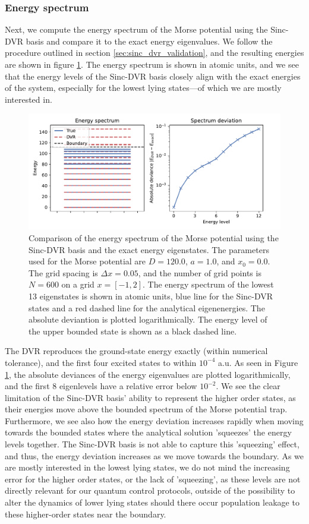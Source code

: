 \documentclass{subfiles}
\begin{document}
\subsubsection*{Energy spectrum}
Next, we compute the energy spectrum of the Morse potential using the Sinc-DVR basis and compare it to the exact energy eigenvalues. We follow the procedure outlined in section \ref{sec:sinc_dvr_validation}, and the resulting energies are shown in figure \ref{fig:dvr_validation}. The energy spectrum is shown in atomic units, and we see that the energy levels of the Sinc-DVR basis closely align with the exact energies of the system, especially for the lowest lying states—of which we are mostly interested in. 
\begin{figure}[h!]
    \centering
    \includegraphics[width=\textwidth]{figs/dvr_validation.pdf}
    \caption{Comparison of the energy spectrum of the Morse potential using the Sinc-DVR basis and the exact energy eigenstates. The parameters used for the Morse potential are $D = 120.0$, $a = 1.0$, and $x_0 = 0.0$. The grid spacing is $\Delta x = 0.05$, and the number of grid points is $N = 600$ on a grid $x=[-1, 2]$. The energy spectrum of the lowest 13 eigenstates is shown in atomic units, blue line for the Sinc-DVR states and a red dashed line for the analytical eigenenergies. The absolute deviantion is plotted logarithmically. The energy level of the upper bounded state is shown as a black dashed line.}
    \label{fig:dvr_validation}
\end{figure}

The DVR reproduces the ground-state energy exactly (within numerical tolerance), and the first four excited states to within $10^{-4}$ a.u. As seen in Figure \ref{fig:dvr_validation}, the absolute deviances of the energy eigenvalues are plotted logarithmically, and the first 8 eigenlevels have a relative error below $10^{-2}$. We see the clear limitation of the Sinc-DVR basis' ability to represent the higher order states, as their energies move above the bounded spectrum of the Morse potential trap. Furthermore, we see also how the energy deviation increases rapidly when moving towards the bounded states where the analytical solution 'squeezes' the energy levels together. The Sinc-DVR basis is not able to capture this 'squeezing' effect, and thus, the energy deviation increases as we move towards the boundary. 
As we are mostly interested in the lowest lying states, we do not mind the increasing error for the higher order states, or the lack of 'squeezing', as these levels are not directly relevant for our quantum control protocols, outside of the possibility to alter the dynamics of lower lying states should there occur population leakage to these higher-order states near the boundary.
\end{document}
